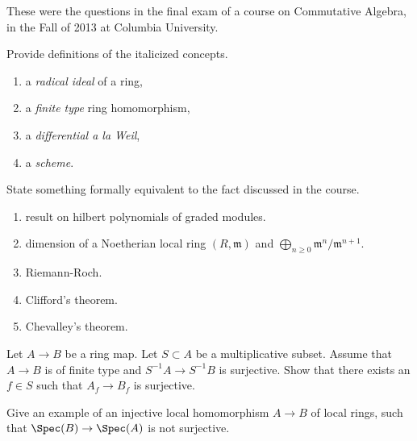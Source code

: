 \noindent
These were the questions in the final exam of a course on
Commutative Algebra, in the Fall of 2013 at Columbia University.

\begin{exercise}[Definitions]
\label{exercise-definitions-fall-2013}
Provide definitions of the italicized concepts.
\begin{enumerate}
\item a {\it radical ideal} of a ring,
\item a {\it finite type} ring homomorphism,
\item a {\it differential a la Weil},
\item a {\it scheme}.
\end{enumerate}
\end{exercise}

\begin{exercise}[Results]
\label{exercise-results-fall-2013}
State something formally equivalent to the fact discussed
in the course.
\begin{enumerate}
\item result on hilbert polynomials of graded modules.
\item dimension of a Noetherian local ring $(R, \mathfrak m)$ and
$\bigoplus_{n \geq 0} \mathfrak m^n/\mathfrak m^{n + 1}$.
\item Riemann-Roch.
\item Clifford's theorem.
\item Chevalley's theorem.
\end{enumerate}
\end{exercise}

\begin{exercise}
\label{exercise-surjective-after-localization}
Let $A \to B$ be a ring map. Let $S \subset A$ be a multiplicative subset.
Assume that $A \to B$ is of finite type and $S^{-1}A \to S^{-1}B$ is
surjective. Show that there exists an $f \in S$ such that $A_f \to B_f$
is surjective.
\end{exercise}

\begin{exercise}
\label{exercise-injective-local-ring-map-not-surjective}
Give an example of an injective local homomorphism $A \to B$
of local rings, such that $\Spec(B) \to \Spec(A)$ is not surjective.
\end{exercise}

